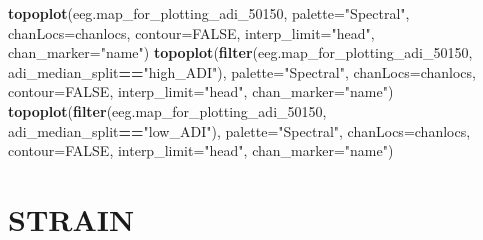 \documentclass[
]{article}
\newenvironment{Shaded}{\begin{snugshade}}{\end{snugshade}}
\newcommand{\AttributeTok}[1]{\textcolor[rgb]{0.13,0.29,0.53}{#1}}
\newcommand{\ConstantTok}[1]{\textcolor[rgb]{0.56,0.35,0.01}{#1}}
\newcommand{\FunctionTok}[1]{\textcolor[rgb]{0.13,0.29,0.53}{\textbf{#1}}}
\newcommand{\NormalTok}[1]{#1}
\newcommand{\SpecialCharTok}[1]{\textcolor[rgb]{0.81,0.36,0.00}{\textbf{#1}}}
\newcommand{\StringTok}[1]{\textcolor[rgb]{0.31,0.60,0.02}{#1}}
\begin{document}
\begin{Shaded}
\begin{Highlighting}[]
\FunctionTok{topoplot}\NormalTok{(eeg.map\_for\_plotting\_adi\_50150, }\AttributeTok{palette=}\StringTok{"Spectral"}\NormalTok{, }\AttributeTok{chanLocs=}\NormalTok{chanlocs, }\AttributeTok{contour=}\ConstantTok{FALSE}\NormalTok{, }\AttributeTok{interp\_limit=}\StringTok{"head"}\NormalTok{, }\AttributeTok{chan\_marker=}\StringTok{"name"}\NormalTok{)}
\FunctionTok{topoplot}\NormalTok{(}\FunctionTok{filter}\NormalTok{(eeg.map\_for\_plotting\_adi\_50150, adi\_median\_split}\SpecialCharTok{==}\StringTok{"high\_ADI"}\NormalTok{), }\AttributeTok{palette=}\StringTok{"Spectral"}\NormalTok{, }\AttributeTok{chanLocs=}\NormalTok{chanlocs, }\AttributeTok{contour=}\ConstantTok{FALSE}\NormalTok{, }\AttributeTok{interp\_limit=}\StringTok{"head"}\NormalTok{, }\AttributeTok{chan\_marker=}\StringTok{"name"}\NormalTok{)}
\FunctionTok{topoplot}\NormalTok{(}\FunctionTok{filter}\NormalTok{(eeg.map\_for\_plotting\_adi\_50150, adi\_median\_split}\SpecialCharTok{==}\StringTok{"low\_ADI"}\NormalTok{), }\AttributeTok{palette=}\StringTok{"Spectral"}\NormalTok{, }\AttributeTok{chanLocs=}\NormalTok{chanlocs, }\AttributeTok{contour=}\ConstantTok{FALSE}\NormalTok{, }\AttributeTok{interp\_limit=}\StringTok{"head"}\NormalTok{, }\AttributeTok{chan\_marker=}\StringTok{"name"}\NormalTok{)}
\end{Highlighting}
\end{Shaded}

\hypertarget{strain}{%
\section{STRAIN}\label{strain}}
\end{document}
